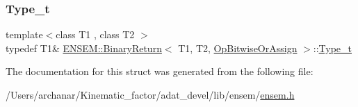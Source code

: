 \mbox{\label{structENSEM_1_1BinaryReturn_3_01T1_00_01T2_00_01OpBitwiseOrAssign_01_4_a26b576167f103506b9c1a03f33944d0f}} 
\subsubsection{\texorpdfstring{Type\_t}{Type\_t}\hspace{0.1cm}{\footnotesize\ttfamily [2/2]}}
{\footnotesize\ttfamily template$<$class T1 , class T2 $>$ \\
typedef T1\& \mbox{\hyperlink{structENSEM_1_1BinaryReturn}{E\+N\+S\+E\+M\+::\+Binary\+Return}}$<$ T1, T2, \mbox{\hyperlink{structENSEM_1_1OpBitwiseOrAssign}{Op\+Bitwise\+Or\+Assign}} $>$\+::\mbox{\hyperlink{structENSEM_1_1BinaryReturn_3_01T1_00_01T2_00_01OpBitwiseOrAssign_01_4_a26b576167f103506b9c1a03f33944d0f}{Type\+\_\+t}}}



The documentation for this struct was generated from the following file\+:\begin{DoxyCompactItemize}
\item 
/\+Users/archanar/\+Kinematic\+\_\+factor/adat\+\_\+devel/lib/ensem/\mbox{\hyperlink{lib_2ensem_2ensem_8h}{ensem.\+h}}\end{DoxyCompactItemize}
